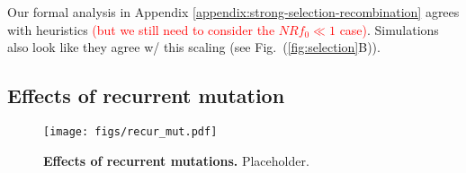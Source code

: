 \documentclass[aps,rmp,twocolumn,groupedaddress,floatfix,notitlepage]{revtex4-1}
\begin{document}
\begin{itemize}
Our formal analysis in Appendix \ref{appendix:strong-selection-recombination} agrees with heuristics \textcolor{red}{(but we still need to consider the $NRf_0 \ll 1$ case)}. Simulations also look like they agree w/ this scaling (see Fig.~(\ref{fig:selection}B)).

\end{itemize}




\newpage
\twocolumngrid
\subsection*{Effects of recurrent mutation}

\begin{figure*}[t]
\centering
\texttt{[image: figs/recur\_mut.pdf]}
\hfill
\caption{\textbf{Effects of recurrent mutations.} Placeholder. \label{fig:recur_muts}}
\end{figure*}
\end{document}
